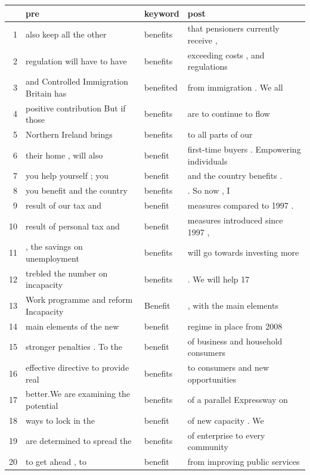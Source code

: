 \documentclass{hertieteaching}
\begin{document}
\begin{frame}{}

\footnotesize
\begin{table}[ht]
\centering
\begin{tabular}{rlll}
  \hline
 & pre & keyword & post \\ 
  \hline
1 & also keep all the other & benefits & that pensioners currently receive , \\ 
  2 & regulation will have to have & benefits & exceeding costs , and regulations \\ 
  3 & and Controlled Immigration Britain has & benefited & from immigration . We all \\ 
  4 & positive contribution But if those & benefits & are to continue to flow \\ 
  5 & Northern Ireland brings & benefits & to all parts of our \\ 
  6 & their home , will also & benefit & first-time buyers . Empowering individuals \\ 
  7 & you help yourself ; you & benefit & and the country benefits . \\ 
  8 & you benefit and the country & benefits & . So now , I \\ 
  9 & result of our tax and & benefit & measures compared to 1997 . \\ 
  10 & result of personal tax and & benefit & measures introduced since 1997 , \\ 
  11 & , the savings on unemployment & benefits & will go towards investing more \\ 
  12 & trebled the number on incapacity & benefits & . We will help 17 \\ 
  13 & Work programme and reform Incapacity & Benefit & , with the main elements \\ 
  14 & main elements of the new & benefit & regime in place from 2008 \\ 
  15 & stronger penalties . To the & benefit & of business and household consumers \\ 
  16 & effective directive to provide real & benefits & to consumers and new opportunities \\ 
  17 & better.We are examining the potential & benefits & of a parallel Expressway on \\ 
  18 & ways to lock in the & benefit & of new capacity . We \\ 
  19 & are determined to spread the & benefits & of enterprise to every community \\ 
  20 & to get ahead , to & benefit & from improving public services\\
   \hline
\end{tabular}
\end{table}
\normalsize

\end{frame}
\end{document}
